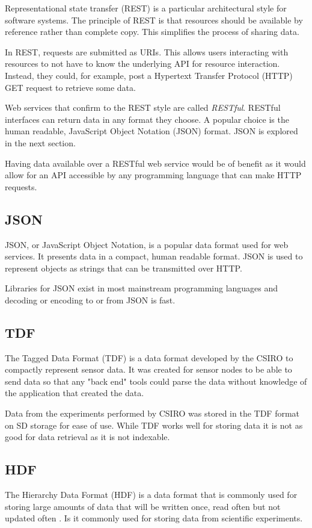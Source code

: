 Representational state transfer (REST) is a particular architectural style for software systems. The principle of REST is that resources should be available by reference rather than complete copy. This simplifies the process of sharing data. 

In REST, requests are submitted as URIs. This allows users interacting with resources to not have to know the underlying API for resource interaction. Instead, they could, for example, post a Hypertext Transfer Protocol (HTTP) GET request to retrieve some data. 

Web services that confirm to the REST style are called \textit{RESTful}. RESTful interfaces can return data in any format they choose. A popular choice is the human readable, JavaScript Object Notation (JSON) format. JSON is explored in the next section.

Having data available over a RESTful web service would be of benefit as it would allow for an API accessible by any programming language that can make HTTP requests.

\subsection{JSON}

JSON, or JavaScript Object Notation, is a popular data format used for web services. It presents data in a compact, human readable format. JSON is used to represent objects as strings that can be transmitted over HTTP. 

Libraries for JSON exist in most mainstream programming languages and decoding or encoding to or from JSON is fast.

\subsection{TDF}
The Tagged Data Format (TDF) is a data format developed by the CSIRO to compactly represent sensor data. It was created for sensor nodes to be able to send data so that any "back end" tools could parse the data without knowledge of the application that created the data. \cite{corke2010environmental}

Data from the experiments performed by CSIRO was stored in the TDF format on SD storage for ease of use. While TDF works well for storing data it is not as good for data retrieval as it is not indexable. 

\subsection{HDF}
The Hierarchy Data Format (HDF) is a data format that is commonly used for storing large amounts of data that will be written once, read often but not updated often \cite{hdf2014hierarchical}. Is it commonly used for storing data from scientific experiments. 


